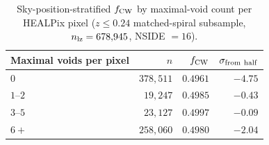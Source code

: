 \documentclass[aps,prd,twocolumn,superscriptaddress,showpacs,preprintnumbers,nofootinbib,longbibliography,floatfix]{revtex4-2}
\begin{document}
\begin{table}[ht]
\caption{Sky-position-stratified $f_{\rm CW}$ by maximal-void count per
HEALPix pixel ($z \leq 0.24$ matched-spiral subsample, $n_{\rm lz} =
678{,}945$, NSIDE $= 16$).}
\label{tab:maximal_void_healpix}
\begin{ruledtabular}
\begin{tabular}{lrrr}
Maximal voids per pixel & $n$ & $f_{\rm CW}$ & $\sigma_{\rm from\ half}$ \\
\hline
$0$  & $378{,}511$ & $0.4961$ & $-4.75$ \\
$1$--$2$ & $19{,}247$ & $0.4985$ & $-0.43$ \\
$3$--$5$ & $23{,}127$ & $0.4997$ & $-0.09$ \\
$6+$ & $258{,}060$ & $0.4980$ & $-2.04$ \\
\end{tabular}
\end{ruledtabular}
\end{table}
\end{document}
